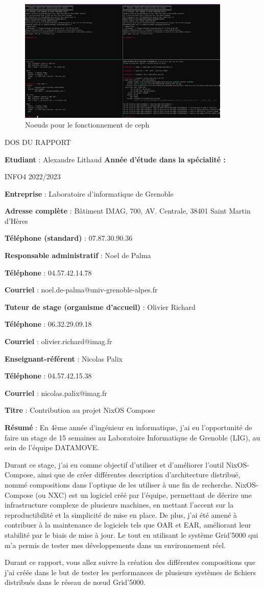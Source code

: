 \documentclass[a4paper,french,12pt, titlepage]{article}
\makeatletter
\newcommand{\makefooter}{%
  \makefooterhooka
}
\newcommand{\makefooterhooka}{%
    \begin{center}
        \begin{Large}
        DOS DU RAPPORT
        \end{Large}
    \end{center}
    
    
    \textbf{Etudiant} : Alexandre Lithaud
    \hfill \textbf{Année d’étude dans la spécialité :}
    
    \hfill INFO4 2022/2023
    
    \hfill
    
    \textbf{Entreprise} : Laboratoire d'informatique de Grenoble 

    \textbf{Adresse complète} : Bâtiment IMAG, 700, AV. Centrale, 38401
Saint Martin d'Hères

    \textbf{Téléphone (standard)} : 07.87.30.90.36
    
    \hfill
    
    \textbf{Responsable administratif} : Noel de Palma 

    \textbf{Téléphone} : 04.57.42.14.78

    \textbf{Courriel} : noel.de-palma@univ-grenoble-alpes.fr

    \hfill
    
    \textbf{Tuteur de stage (organisme d’accueil)} : Olivier Richard

    \textbf{Téléphone} : 06.32.29.09.18

    \textbf{Courriel} : olivier.richard@imag.fr
    
    \hfill
    
    \textbf{Enseignant-référent} : Nicolas Palix

    \textbf{Téléphone} : 04.57.42.15.38 

    \textbf{Courriel} : nicolas.palix@imag.fr 

    \hfill
    
    \textbf{Titre} : Contribution au projet NixOS Compose
    
    \hfill

    \textbf{Résumé} : En 4ème année d'ingénieur en informatique, j'ai eu
l'opportunité de faire un stage de 15 semaines au Laboratoire
Informatique de Grenoble (LIG), au sein de l'équipe DATAMOVE.\newline

Durant ce stage, j'ai eu comme objectif d'utiliser et d'améliorer
l'outil NixOS-Compose, ainsi que de créer différentes description
d'architecture distribué, nommé compositions dans l'optique de les
utiliser à une fin de recherche. NixOS-Compose (ou NXC) est un logiciel
créé par l'équipe, permettant de décrire une infrastructure complexe de
plusieurs machines, en mettant l'accent sur la reproductibilité et la
simplicité de mise en place. De plus, j'ai été amené à contribuer à la
maintenance de logiciels tels que OAR et EAR, améliorant leur stabilité
par le biais de mise à jour. Le tout en utilisant le système Grid'5000
qui m'a permis de tester mes développements dans un environnement
réel.\newline

Durant ce rapport, vous allez suivre la création des différentes
compositions que j'ai créée dans le but de tester les performances de
plusieurs systèmes de fichiers distribués dans le réseau de nœud
Grid'5000.
}
\makeatother
\begin{document}
\begin{figure}
\centering
\includegraphics[width=0.9\textwidth,height=0.9\textheight,keepaspectratio]{annexe/ceph_osd_up.png}
\caption{Noeuds pour le fonctionnement de ceph}
\end{figure}

\begin{titlingpage}
\clearpage
\makefooter
\end{titlingpage}
\end{document}
